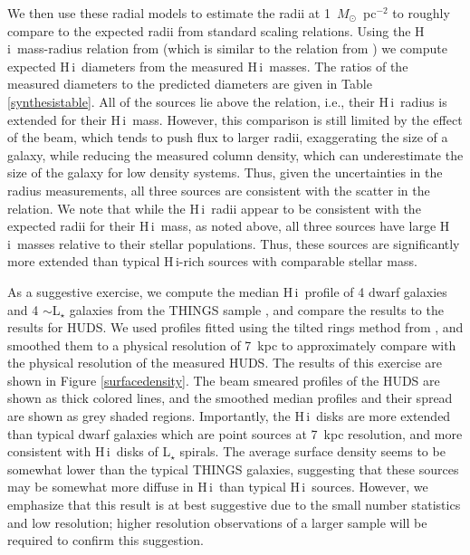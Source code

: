 \documentclass[twocolumn]{aastex6}
\newcommand{\msun}{M_{\odot}}
\def\msun{$M_\odot$}
\newcommand{\hi}{H{\sc\,i}}
\begin{document}
We then use these radial models to estimate the radii at 1~\msun~pc$^{-2}$ to roughly compare to the expected radii from standard scaling relations. Using the \hi\ mass-radius relation from \cite{broeils97a} (which is similar to the relation from \citealp{wang16a}) we compute expected \hi\ diameters from the measured \hi\ masses. The ratios of the measured diameters to the predicted diameters are given in Table \ref{synthesistable}. All of the sources lie above the relation, i.e., their \hi\ radius is extended for their \hi\ mass. However, this comparison is still limited by the effect of the beam, which tends to push flux to larger radii, exaggerating the size of a galaxy, while reducing the measured column density, which can underestimate the size of the galaxy for low density systems. Thus, 
given the uncertainties in the radius measurements, all three sources are consistent with the scatter in the relation. We note that while the \hi\ radii appear to be consistent with the expected radii for their \hi\ mass, as noted above, all three sources have large \hi\ masses relative to their stellar populations. Thus, these sources are significantly more extended than typical \hi-rich sources with comparable stellar mass.

As a suggestive exercise, we compute the median \hi\ profile of 4 dwarf galaxies and 4 $\sim$L$_{\star}$ galaxies from the THINGS sample \citep{walter08a}, and compare the results to the results for HUDS. We used profiles fitted using the tilted rings method from \cite{leroy08a}, and smoothed them to a physical resolution of 7~kpc to approximately compare with the physical resolution of the measured HUDS. The results of this exercise are shown in Figure \ref{surfacedensity}. The beam smeared profiles of the HUDS are shown as thick colored lines, and the smoothed median profiles and their spread are shown as grey shaded regions. Importantly, the \hi\ disks are more extended than typical dwarf galaxies which are point sources at 7~kpc resolution, and more consistent with \hi\ disks of L$_{\star}$ spirals. The average surface density seems to be somewhat lower than the typical THINGS galaxies, suggesting that these sources may be somewhat more diffuse in \hi\ than typical \hi\ sources. However, we emphasize that this result is at best suggestive due to the small number statistics and low resolution; higher resolution observations of a larger sample will be required to confirm this suggestion.
\end{document}
